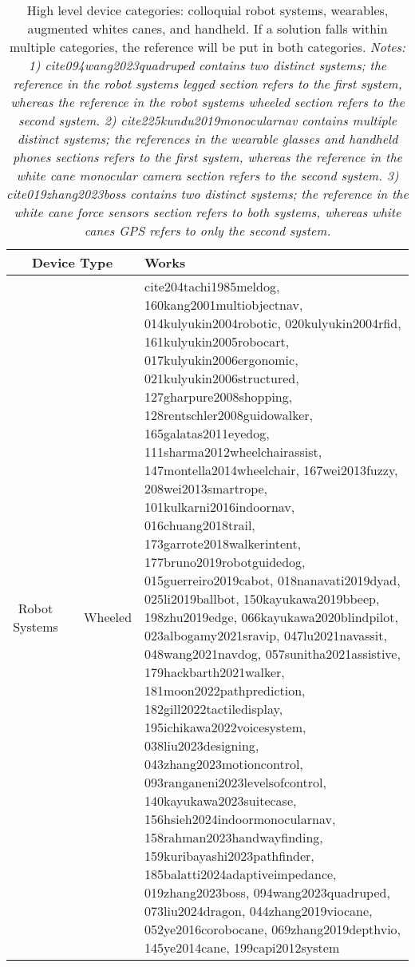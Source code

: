 \begin{table*}[htbp!]
    \centering
    \caption{High level device categories: colloquial robot systems, wearables, augmented whites canes, and handheld. If a solution falls within multiple categories, the reference will be put in both categories. \textit{Notes: 1) cite{094wang2023quadruped} contains two distinct systems; the reference in the robot systems legged section refers to the first system, whereas the reference in the robot systems wheeled section refers to the second system. 2) cite{225kundu2019monocularnav} contains multiple distinct systems; the references in the wearable glasses and handheld phones sections refers to the first system, whereas the reference in the white cane monocular camera section refers to the second system. 3) cite{019zhang2023boss} contains two distinct systems; the reference in the white cane force sensors section refers to both systems, whereas white canes GPS refers to only the second system. }}
    \begin{tabular}{c c l p{}}
    \toprule
         \multicolumn{3}{c}{Device Type} & Works \\
         
         \midrule
         
        \multirow{8}{*}{Robot Systems} & 
        \multirow{8}{*}{} & 
         
         Wheeled & 
         cite{204tachi1985meldog, 160kang2001multiobjectnav, 014kulyukin2004robotic, 020kulyukin2004rfid, 161kulyukin2005robocart, 017kulyukin2006ergonomic, 021kulyukin2006structured, 127gharpure2008shopping, 128rentschler2008guidowalker, 165galatas2011eyedog, 111sharma2012wheelchairassist, 147montella2014wheelchair, 167wei2013fuzzy, 208wei2013smartrope, 101kulkarni2016indoornav, 016chuang2018trail, 173garrote2018walkerintent, 177bruno2019robotguidedog, 015guerreiro2019cabot, 018nanavati2019dyad, 025li2019ballbot, 150kayukawa2019bbeep, 198zhu2019edge, 066kayukawa2020blindpilot, 023albogamy2021sravip, 047lu2021navassit, 048wang2021navdog, 057sunitha2021assistive, 179hackbarth2021walker, 181moon2022pathprediction, 182gill2022tactiledisplay, 195ichikawa2022voicesystem, 038liu2023designing, 043zhang2023motioncontrol, 093ranganeni2023levelsofcontrol, 140kayukawa2023suitecase, 156hsieh2024indoormonocularnav, 158rahman2023handwayfinding, 159kuribayashi2023pathfinder, 185balatti2024adaptiveimpedance, 019zhang2023boss, 094wang2023quadruped, 073liu2024dragon, 044zhang2019viocane, 052ye2016corobocane, 069zhang2019depthvio, 145ye2014cane, 199capi2012system} \\
         

\end{tabular}
\end{table*}
